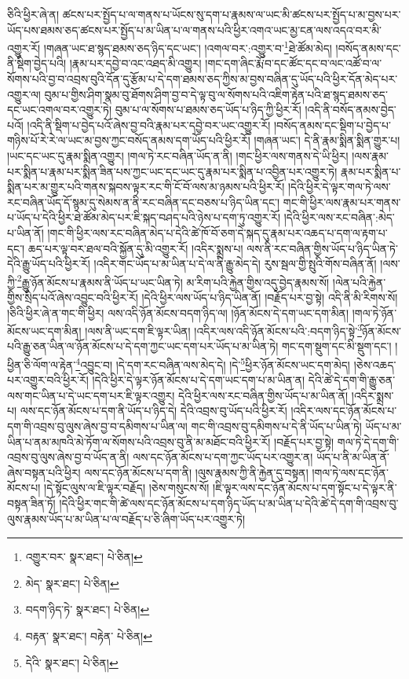 ཅིའི་ཕྱིར་ཞེ་ན། ཚངས་པར་སྤྱོད་པ་ལ་གནས་པ་ཡོངས་སུ་དག་པ་རྣམས་ལ་ཡང་མི་ཚངས་པར་སྤྱོད་པ་མ་བྱས་པར་ཡོད་པས་ཐམས་ཅད་ཚངས་པར་སྤྱོད་པ་མ་ཡིན་པ་ལ་གནས་པའི་ཕྱིར་འགའ་ཡང་མྱ་ངན་ལས་འདའ་བར་མི་འགྱུར་རོ། །གཞན་ཡང་ཐ་སྙད་ཐམས་ཅད་ཉིད་དང་ཡང་། །འགལ་བར་:འགྱུར་བ་\footnote{འགྱུར་བར་  སྣར་ཐང་།  པེ་ཅིན། }ཐེ་ཚོམ་མེད། །བསོད་ནམས་དང་ནི་སྡིག་བྱེད་པའི། །རྣམ་པར་དབྱེ་བ་འང་འཐད་མི་འགྱུར། །གང་དག་ཞིང་རྨོ་བ་དང་ཚོང་དང་བ་ལང་འཚོ་བ་ལ་སོགས་པའི་བྱ་བ་འབྲས་བུའི་དོན་དུ་རྩོམ་པ་དེ་དག་ཐམས་ཅད་ཀྱིས་མ་བྱས་བཞིན་དུ་ཡོད་པའི་ཕྱིར་དོན་མེད་པར་འགྱུར་ལ། བུམ་པ་གྱིས་ཤིག་སྣམ་བུ་ཐོགས་ཤིག་བྱ་བ་དེ་ལྟ་བུ་ལ་སོགས་པའི་འཇིག་རྟེན་པའི་ཐ་སྙད་ཐམས་ཅད་དང་ཡང་འགལ་བར་འགྱུར་ཏེ། བུམ་པ་ལ་སོགས་པ་ཐམས་ཅད་ཡོད་པ་ཉིད་ཀྱི་ཕྱིར་རོ། །འདི་ནི་བསོད་ནམས་བྱེད་པའོ། །འདི་ནི་སྡིག་པ་བྱེད་པའོ་ཞེས་བྱ་བའི་རྣམ་པར་དབྱེ་བར་ཡང་འགྱུར་རོ། །བསོད་ནམས་དང་སྡིག་པ་བྱེད་པ་གཉིས་པོ་རེ་རེ་ལ་ཡང་མ་བྱས་ཀྱང་བསོད་ནམས་དག་ཡོད་པའི་ཕྱིར་རོ། །གཞན་ཡང་། དེ་ནི་རྣམ་སྨིན་སྨིན་གྱུར་པ། །ཡང་དང་ཡང་དུ་རྣམ་སྨིན་འགྱུར། །གལ་ཏེ་རང་བཞིན་ཡོད་ན་ནི། །གང་ཕྱིར་ལས་གནས་དེ་ཡི་ཕྱིར། །ལས་རྣམ་པར་སྨིན་པ་རྣམ་པར་སྨིན་ཟིན་པས་ཀྱང་ཡང་དང་ཡང་དུ་རྣམ་པར་སྨིན་པ་འབྱིན་པར་འགྱུར་ཏེ། རྣམ་པར་སྨིན་པ་སྨིན་པར་མ་གྱུར་པའི་གནས་སྐབས་ལྟར་རང་གི་ངོ་བོ་ལས་མ་ཉམས་པའི་ཕྱིར་རོ། །དེའི་ཕྱིར་དེ་ལྟར་གལ་ཏེ་ལས་རང་བཞིན་ཡོད་དོ་སྙམ་དུ་སེམས་ན་ནི་རང་བཞིན་དང་བཅས་པ་ཉིད་ཡིན་དང་། གང་གི་ཕྱིར་ལས་རྣམ་པར་གནས་པ་ཡོད་པ་དེའི་ཕྱིར་ཐེ་ཚོམ་མེད་པར་ཇི་སྐད་བཤད་པའི་ཉེས་པ་དག་ཏུ་འགྱུར་རོ། །དེའི་ཕྱིར་ལས་རང་བཞིན་:མེད་པ་ཡིན་ནོ། །གང་གི་ཕྱིར་ལས་རང་བཞིན་མེད་པ་དེའི་ཚེ་ཁོ་བོ་ཅག་དེ་སྐད་དུ་རྣམ་པར་འཆད་པ་དག་ལ་རྟག་པ་དང་། ཆད་པར་ལྟ་བར་ཐལ་བའི་སྐྱོན་དུ་མི་འགྱུར་རོ། །འདིར་སྨྲས་པ། ལས་ནི་རང་བཞིན་གྱིས་ཡོད་པ་ཉིད་ཡིན་ཏེ་དེའི་རྒྱུ་ཡོད་པའི་ཕྱིར་རོ། །འདིར་གང་ཡོད་པ་མ་ཡིན་པ་དེ་ལ་ནི་རྒྱུ་མེད་དེ། རུས་སྦལ་གྱི་སྤུའི་གོས་བཞིན་ནོ། །ལས་ཀྱི་\footnote{མེད་  སྣར་ཐང་།  པེ་ཅིན། }རྒྱུ་ཉོན་མོངས་པ་རྣམས་ནི་ཡོད་པ་ཡང་ཡིན་ཏེ། མ་རིག་པའི་རྐྱེན་གྱིས་འདུ་བྱེད་རྣམས་སོ། །ལེན་པའི་རྐྱེན་གྱིས་སྲིད་པའོ་ཞེས་འབྱུང་བའི་ཕྱིར་རོ། །དེའི་ཕྱིར་ལས་ཡོད་པ་ཉིད་ཡིན་ནོ། །བརྗོད་པར་བྱ་སྟེ། འདི་ནི་མི་རིགས་སོ། །ཅིའི་ཕྱིར་ཞེ་ན་གང་གི་ཕྱིར། ལས་འདི་ཉོན་མོངས་བདག་ཉིད་ལ། །ཉོན་མོངས་དེ་དག་ཡང་དག་མིན། །གལ་ཏེ་ཉོན་མོངས་ཡང་དག་མིན། །ལས་ནི་ཡང་དག་ཇི་ལྟར་ཡིན། །འདིར་ལས་འདི་ཉོན་མོངས་པའི་:བདག་ཉིད་སྟེ་\footnote{བདག་ཉིད་ཏེ་  སྣར་ཐང་།  པེ་ཅིན། }ཉོན་མོངས་པའི་རྒྱུ་ཅན་ཡིན་ལ་ཉོན་མོངས་པ་དེ་དག་ཀྱང་ཡང་དག་པར་ཡོད་པ་མ་ཡིན་ཏེ། གང་དག་སྡུག་དང་མི་སྡུག་དང་། །ཕྱིན་ཅི་ལོག་ལ་རྟེན་\footnote{བརྟན་  སྣར་ཐང་། བརྟེན་  པེ་ཅིན། }འབྱུང་བ། །དེ་དག་རང་བཞིན་ལས་མེད་དེ། །དེ་\footnote{དེའི་  སྣར་ཐང་།  པེ་ཅིན། }ཕྱིར་ཉོན་མོངས་ཡང་དག་མེད། །ཅེས་འཆད་པར་འགྱུར་བའི་ཕྱིར་རོ། །དེའི་ཕྱིར་དེ་ལྟར་ཉོན་མོངས་པ་དེ་དག་ཡང་དག་པ་མ་ཡིན་ན། དེའི་ཚེ་དེ་དག་གི་རྒྱུ་ཅན་ལས་གང་ཡིན་པ་དེ་ཡང་དག་པར་ཇི་ལྟར་འགྱུར། དེའི་ཕྱིར་ལས་རང་བཞིན་གྱིས་ཡོད་པ་མ་ཡིན་ནོ། །འདིར་སྨྲས་པ། ལས་དང་ཉོན་མོངས་པ་དག་ནི་ཡོད་པ་ཉིད་དེ། དེའི་འབྲས་བུ་ཡོད་པའི་ཕྱིར་རོ། །འདིར་ལས་དང་ཉོན་མོངས་པ་དག་གི་འབྲས་བུ་ལུས་ཞེས་བྱ་བ་དམིགས་པ་ཡིན་ལ། གང་གི་འབྲས་བུ་དམིགས་པ་དེ་ནི་ཡོད་པ་ཡིན་ཏེ། ཡོད་པ་མ་ཡིན་པ་ནམ་མཁའི་མེ་ཏོག་ལ་སོགས་པའི་འབྲས་བུ་ནི་མ་མཐོང་བའི་ཕྱིར་རོ། །བརྗོད་པར་བྱ་སྟེ། གལ་ཏེ་དེ་དག་གི་འབྲས་བུ་ལུས་ཞེས་བྱ་བ་ཡོད་ན་ནི། ལས་དང་ཉོན་མོངས་པ་དག་ཀྱང་ཡོད་པར་འགྱུར་ན། ཡོད་པ་ནི་མ་ཡིན་ནོ་ཞེས་བསྟན་པའི་ཕྱིར། ལས་དང་ཉོན་མོངས་པ་དག་ནི། །ལུས་རྣམས་ཀྱི་ནི་རྐྱེན་དུ་བསྟན། །གལ་ཏེ་ལས་དང་ཉོན་མོངས་པ། །དེ་སྟོང་ལུས་ལ་ཇི་ལྟར་བརྗོད། །ཅེས་གསུངས་སོ། །ཇི་ལྟར་ལས་དང་ཉོན་མོངས་པ་དག་སྟོང་པ་དེ་ལྟར་ནི་བསྟན་ཟིན་ཏོ། །དེའི་ཕྱིར་གང་གི་ཚེ་ལས་དང་ཉོན་མོངས་པ་དག་ཉིད་ཡོད་པ་མ་ཡིན་པ་དེའི་ཚེ་དེ་དག་གི་འབྲས་བུ་ལུས་རྣམས་ཡོད་པ་མ་ཡིན་པ་ལ་བརྗོད་པ་ཅི་ཞིག་ཡོད་པར་འགྱུར་ཏེ། 